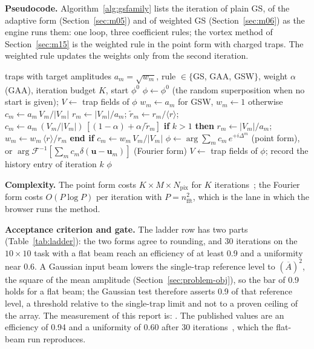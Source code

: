 \textbf{Pseudocode.} Algorithm~\ref{alg:gsfamily} lists the iteration of plain GS, of the adaptive form (Section~\ref{sec:m05}) and of weighted GS (Section~\ref{sec:m06}) as the engine runs them: one loop, three coefficient rules; the vortex method of Section~\ref{sec:m15} is the weighted rule in the point form with charged traps. The weighted rule updates the weights only from the second iteration.

\begin{algorithm}[t]
\caption{The Gerchberg--Saxton family in the trap form, with the coefficient rule as a parameter: plain GS, the adaptive form and weighted GS (the engine loop of the module \texttt{\_gs}); the point form back-projects with Eq.~\eqref{eq:delay} and the Fourier form with the focal deltas of Eq.~\eqref{eq:m04-fft}.}
\label{alg:gsfamily}
\begin{algorithmic}[1]
\Require traps with target amplitudes $a_m=\sqrt{w_m}$, rule $\in\{$GS, GAA, GSW$\}$, weight $\alpha$ (GAA), iteration budget $K$, start $\phi^0$
\State $\phi\gets\phi^0$ (the random superposition when no start is given); $V\gets$ trap fields of $\phi$
\State $w_m\gets a_m$ for GSW, $w_m\gets1$ otherwise
   \State $c_m\gets a_m\,V_m/|V_m|$
   \State $r_m\gets|V_m|/a_m$; $\tilde r_m\gets r_m/\langle r\rangle$; $c_m\gets a_m\,(V_m/|V_m|)\,[(1-\alpha)+\alpha/\tilde r_m]$
  \Else \State \textbf{if} $k>1$ \textbf{then} $r_m\gets|V_m|/a_m$; $w_m\gets w_m\,\langle r\rangle/r_m$ \textbf{end if}
  \State $c_m\gets w_m\,V_m/|V_m|$
  \EndIf
  \State $\phi\gets\arg\sum_m c_m\,e^{+i\Delta^m}$ (point form), or $\arg\mathcal F^{-1}[\sum_m c_m\delta(\mathbf u-\mathbf u_m)]$ (Fourier form)
  \State $V\gets$ trap fields of $\phi$; record the history entry of iteration $k$
\EndFor
\State \Return $\phi$
\end{algorithmic}
\end{algorithm}

\textbf{Complexity.} The point form costs $K\times M\times N_{\mathrm{pix}}$ for $K$ iterations~\cite{dileonardo}; the Fourier form costs $O(P\log P)$ per iteration with $P=n_{\mathrm{fft}}^2$, which is the lane in which the browser runs the method.

\textbf{Acceptance criterion and gate.} The ladder row has two parts (Table~\ref{tab:ladder}): the two forms agree to rounding, and 30 iterations on the $10\times10$ task with a flat beam reach an efficiency of at least 0.9 and a uniformity near 0.6. A Gaussian input beam lowers the single-trap reference level to $(\overline A)^2$, the square of the mean amplitude (Section~\ref{sec:problem-obj}), so the bar of 0.9 holds for a flat beam; the Gaussian test therefore asserts 0.9 of that reference level, a threshold relative to the single-trap limit and not to a proven ceiling of the array. The measurement of this report is: . The published values are an efficiency of 0.94 and a uniformity of 0.60 after 30 iterations~\cite{dileonardo}, which the flat-beam run reproduces.

